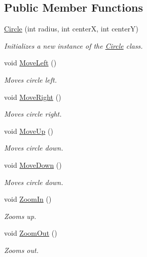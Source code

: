 \subsection*{Public Member Functions}
\begin{DoxyCompactItemize}
\item 
\mbox{\hyperlink{class_test_project_1_1_task_library_1_1_tasks_1_1_lesson6_1_1_models_1_1_circle_aa5a428622acc512fbf5ba682035530e2}{Circle}} (int radius, int centerX, int centerY)
\begin{DoxyCompactList}\small\item\em Initializes a new instance of the \mbox{\hyperlink{class_test_project_1_1_task_library_1_1_tasks_1_1_lesson6_1_1_models_1_1_circle}{Circle}} class. \end{DoxyCompactList}\item 
void \mbox{\hyperlink{class_test_project_1_1_task_library_1_1_tasks_1_1_lesson6_1_1_models_1_1_circle_ae827e79380443cdad964c963c3debdc8}{Move\+Left}} ()
\begin{DoxyCompactList}\small\item\em Moves circle left. \end{DoxyCompactList}\item 
void \mbox{\hyperlink{class_test_project_1_1_task_library_1_1_tasks_1_1_lesson6_1_1_models_1_1_circle_aa5dc626f3077944c63847ca34e808c9c}{Move\+Right}} ()
\begin{DoxyCompactList}\small\item\em Moves circle right. \end{DoxyCompactList}\item 
void \mbox{\hyperlink{class_test_project_1_1_task_library_1_1_tasks_1_1_lesson6_1_1_models_1_1_circle_a3b0881cfdf932fb6bc56cf8c99fb110b}{Move\+Up}} ()
\begin{DoxyCompactList}\small\item\em Moves circle down. \end{DoxyCompactList}\item 
void \mbox{\hyperlink{class_test_project_1_1_task_library_1_1_tasks_1_1_lesson6_1_1_models_1_1_circle_a4696527a84763f1a272e58532916bd48}{Move\+Down}} ()
\begin{DoxyCompactList}\small\item\em Moves circle down. \end{DoxyCompactList}\item 
void \mbox{\hyperlink{class_test_project_1_1_task_library_1_1_tasks_1_1_lesson6_1_1_models_1_1_circle_a9655a2ef826e2fc1e6dd7f9395d17c4b}{Zoom\+In}} ()
\begin{DoxyCompactList}\small\item\em Zooms up. \end{DoxyCompactList}\item 
void \mbox{\hyperlink{class_test_project_1_1_task_library_1_1_tasks_1_1_lesson6_1_1_models_1_1_circle_abde3e575c891819e0bd8c97a3d0472e7}{Zoom\+Out}} ()
\begin{DoxyCompactList}\small\item\em Zooms out. \end{DoxyCompactList}\end{DoxyCompactItemize}
